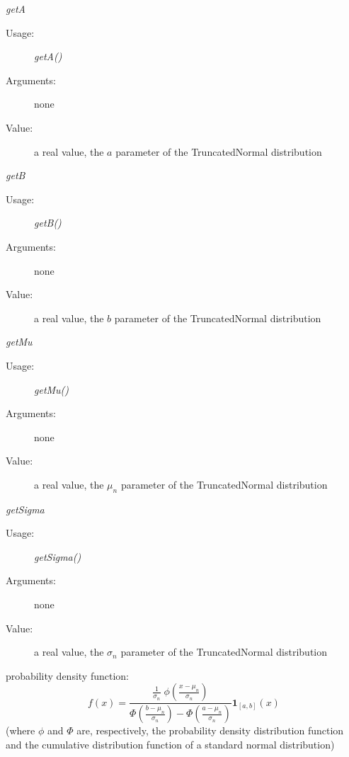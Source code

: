 \begin{description}
\begin{description}
\item \textit{getA}
\begin{description}
\item[Usage:] \textit{getA()}
\item[Arguments:] none
\item[Value:]  a real value, the $a$ parameter of the TruncatedNormal distribution
\end{description}
\bigskip
\item \textit{getB}
\begin{description}
\item[Usage:] \textit{getB()}
\item[Arguments:] none
\item[Value:]  a real value, the  $b$ parameter of the TruncatedNormal distribution
\end{description}
\bigskip
\item \textit{getMu}
\begin{description}
\item[Usage:] \textit{getMu()}
\item[Arguments:] none
\item[Value:]  a real value, the $\mu_n$ parameter of the TruncatedNormal distribution
\end{description}
\bigskip
\item \textit{getSigma}
\begin{description}
\item[Usage:] \textit{getSigma()}
\item[Arguments:] none
\item[Value:]  a real value, the $\sigma_n$ parameter of the TruncatedNormal distribution
\end{description}
\bigskip
\end{description}

\item[Details:]  \rule{0pt}{1em}
\begin{description}
\item probability density function:
\begin{equation}
f(x) =
\frac{\frac{1}{\sigma_n}\;\phi(\frac{x-\mu_n}{\sigma_n})}
{\Phi(\frac{b-\mu_n}{\sigma_n}) - \Phi(\frac{a-\mu_n}{\sigma_n})}
\boldsymbol{1}_{[a, b]}(x)
\end{equation}
(where $\phi$ and $\Phi$ are, respectively, the probability density distribution function and the cumulative
distribution function of a standard normal distribution)


\end{description}
\end{description}
